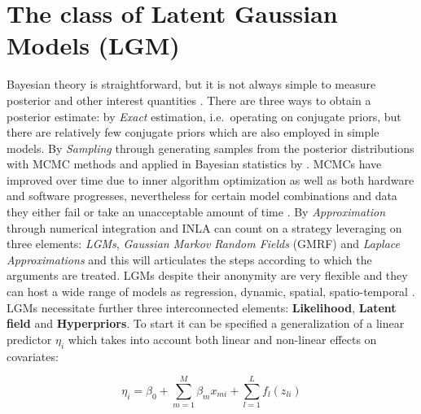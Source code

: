 \documentclass[
  12pt,
  a4paper,
  oneside]{book}
\theoremstyle{definition}
\theoremstyle{definition}
\theoremstyle{definition}
\theoremstyle{remark}
\begin{document}
\hypertarget{LGM}{%
\section{The class of Latent Gaussian Models (LGM)}\label{LGM}}

Bayesian theory is straightforward, but it is not always simple to measure posterior and other interest quantities \citep{wang2018bayesian}. There are three ways to obtain a posterior estimate: by \emph{Exact} estimation, i.e.~operating on conjugate priors, but there are relatively few conjugate priors which are also employed in simple models. By \emph{Sampling} through generating samples from the posterior distributions with MCMC methods \citep{hastings, metropolis} and applied in Bayesian statistics by \citet{gelfand1990sampling}. MCMCs have improved over time due to inner algorithm optimization as well as both hardware and software progresses, nevertheless for certain model combinations and data they either fail or take an unacceptable amount of time \citeyearpar{wang2018bayesian}. By \emph{Approximation} through numerical integration and INLA can count on a strategy leveraging on three elements: \emph{LGMs}, \emph{Gaussian Markov Random Fields} (GMRF) and \emph{Laplace Approximations} and this will articulates the steps according to which the arguments are treated. LGMs despite their anonymity are very flexible and they can host a wide range of models as regression, dynamic, spatial, spatio-temporal \citep{Cameletti2012}. LGMs necessitate further three interconnected elements: \textbf{Likelihood}, \textbf{Latent field} and \textbf{Hyperpriors}.
To start it can be specified a generalization of a linear predictor \(\eta_{i}\) which takes into account both linear and non-linear effects on covariates:

\begin{equation}
  \eta_{i}=\beta_{0}+\sum_{m=1}^{M} \beta_{m} x_{m i}+\sum_{l=1}^{L} f_{l}\left(z_{l i}\right)
\label{eq:linearpredictor}
\end{equation}
\end{document}
